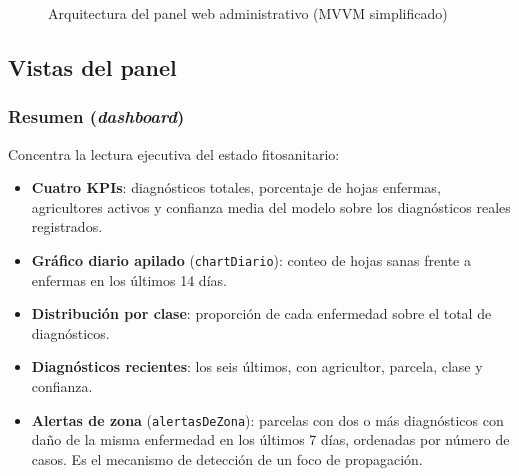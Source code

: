 \documentclass[12pt,a4paper]{article}
\begin{document}
\begin{figure}[H]
\centering
{}%
\caption{Arquitectura del panel web administrativo (MVVM simplificado)}
\label{fig:arq_web}
\end{figure}

\subsection{Vistas del panel}

\subsubsection{Resumen (\textit{dashboard})}

Concentra la lectura ejecutiva del estado fitosanitario:

\begin{itemize}
  \item \textbf{Cuatro KPIs}: diagnósticos totales, porcentaje de hojas enfermas,
        agricultores activos y confianza media del modelo sobre los diagnósticos
        reales registrados.
  \item \textbf{Gráfico diario apilado} (\texttt{chartDiario}): conteo de hojas
        sanas frente a enfermas en los últimos 14 días.
  \item \textbf{Distribución por clase}: proporción de cada enfermedad sobre el
        total de diagnósticos.
  \item \textbf{Diagnósticos recientes}: los seis últimos, con agricultor,
        parcela, clase y confianza.
  \item \textbf{Alertas de zona} (\texttt{alertasDeZona}): parcelas con dos o más
        diagnósticos con daño de la misma enfermedad en los últimos 7 días,
        ordenadas por número de casos. Es el mecanismo de detección de un foco de
        propagación.
\end{itemize}
\end{document}

